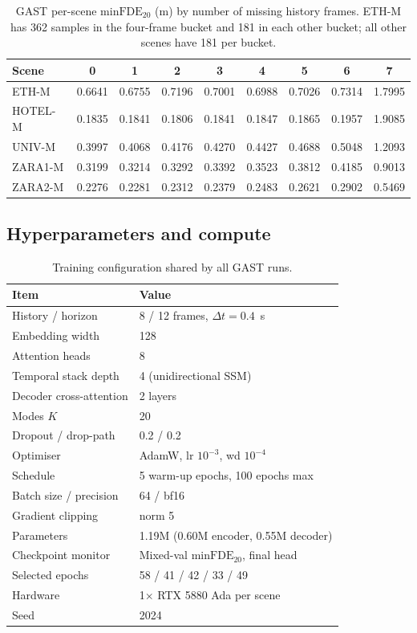 \begin{table}[t]
\centering
\scriptsize
\setlength{\tabcolsep}{2.6pt}
\caption{GAST per-scene $\mathrm{minFDE}_{20}$ (m) by number of missing history frames. ETH-M has 362 samples in the four-frame bucket and 181 in each other bucket; all other scenes have 181 per bucket.}
\label{tab:appstrat}
\begin{tabular}{@{}lcccccccc@{}}
\toprule
Scene & 0 & 1 & 2 & 3 & 4 & 5 & 6 & 7 \\
\midrule
ETH-M   & 0.6641 & 0.6755 & 0.7196 & 0.7001 & 0.6988 & 0.7026 & 0.7314 & 1.7995 \\
HOTEL-M & 0.1835 & 0.1841 & 0.1806 & 0.1841 & 0.1847 & 0.1865 & 0.1957 & 1.9085 \\
UNIV-M  & 0.3997 & 0.4068 & 0.4176 & 0.4270 & 0.4427 & 0.4688 & 0.5048 & 1.2093 \\
ZARA1-M & 0.3199 & 0.3214 & 0.3292 & 0.3392 & 0.3523 & 0.3812 & 0.4185 & 0.9013 \\
ZARA2-M & 0.2276 & 0.2281 & 0.2312 & 0.2379 & 0.2483 & 0.2621 & 0.2902 & 0.5469 \\
\bottomrule
\end{tabular}
\end{table}

\subsection{Hyperparameters and compute}
\label{app:hparams}

\begin{table}[t]
\centering
\footnotesize
\caption{Training configuration shared by all GAST runs.}
\label{tab:hparams}
\begin{tabular}{@{}ll@{}}
\toprule
Item & Value \\
\midrule
History / horizon & 8 / 12 frames, $\Delta t=0.4$~s \\
Embedding width & 128 \\
Attention heads & 8 \\
Temporal stack depth & 4 (unidirectional SSM) \\
Decoder cross-attention & 2 layers \\
Modes $K$ & 20 \\
Dropout / drop-path & 0.2 / 0.2 \\
Optimiser & AdamW, lr $10^{-3}$, wd $10^{-4}$ \\
Schedule & 5 warm-up epochs, 100 epochs max \\
Batch size / precision & 64 / bf16 \\
Gradient clipping & norm 5 \\
Parameters & 1.19M (0.60M encoder, 0.55M decoder) \\
Checkpoint monitor & Mixed-val $\mathrm{minFDE}_{20}$, final head \\
Selected epochs & 58 / 41 / 42 / 33 / 49 \\
Hardware & 1$\times$ RTX 5880 Ada per scene \\
Seed & 2024 \\
\bottomrule
\end{tabular}
\end{table}

